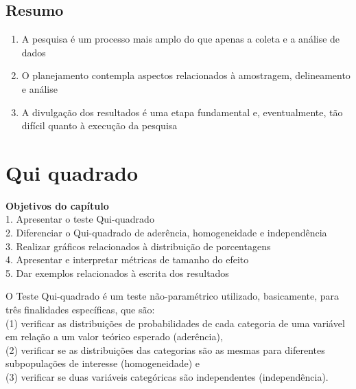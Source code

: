 \documentclass[
]{book}
\providecommand{\tightlist}{%
  \setlength{\itemsep}{0pt}\setlength{\parskip}{0pt}}
\newenvironment{explore}{
  \definecolor{shadecolor}{rgb}{0, 0, 0}  %
  \color{white}
  \begin{shaded}}
 {\end{shaded}}
\newenvironment{objectives}{
  \definecolor{shadecolor}{rgb}{0, 0, 0}  %
  \color{white}
  \begin{shaded}}
 {\end{shaded}}
\begin{document}
\hypertarget{resumo-5}{%
\section{Resumo}\label{resumo-5}}

\begin{explore}

\begin{enumerate}
\def\labelenumi{\arabic{enumi}.}
\tightlist
\item
  A pesquisa é um processo mais amplo do que apenas a coleta e a análise de dados\\
\item
  O planejamento contempla aspectos relacionados à amostragem, delineamento e análise\\
\item
  A divulgação dos resultados é uma etapa fundamental e, eventualmente, tão difícil quanto à execução da pesquisa\\
\end{enumerate}

\end{explore}

\hypertarget{qui-quadrado}{%
\chapter{Qui quadrado}\label{qui-quadrado}}

\begin{objectives}

\textbf{Objetivos do capítulo}\\
1. Apresentar o teste Qui-quadrado\\
2. Diferenciar o Qui-quadrado de aderência, homogeneidade e independência\\
3. Realizar gráficos relacionados à distribuição de porcentagens\\
4. Apresentar e interpretar métricas de tamanho do efeito\\
5. Dar exemplos relacionados à escrita dos resultados

\end{objectives}

O Teste Qui-quadrado é um teste não-paramétrico utilizado, basicamente, para três finalidades específicas, que são:\\
(1) verificar as distribuições de probabilidades de cada categoria de uma variável em relação a um valor teórico esperado (aderência),\\
(2) verificar se as distribuições das categorias são as mesmas para diferentes subpopulações de interesse (homogeneidade) e\\
(3) verificar se duas variáveis categóricas são independentes (independência).
\end{document}
